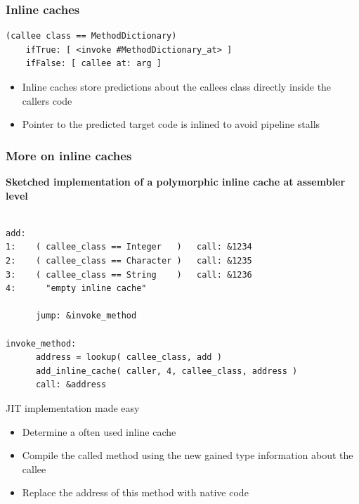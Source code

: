 \documentclass{beamer}
\begin{document}
\begin{frame}[fragile]
    \frametitle{Inline caches}

    \begin{lstlisting}
(callee class == MethodDictionary)
    ifTrue: [ <invoke #MethodDictionary_at> ]
    ifFalse: [ callee at: arg ]
    \end{lstlisting}

    \begin{itemize}
        \item Inline caches store predictions about the callees class directly inside the callers code
        \item Pointer to the predicted target code is inlined to avoid pipeline stalls
    \end{itemize}
\end{frame}

\lstset{language=C}

\begin{frame}[fragile]
    \frametitle{More on inline caches}

    {\bf Sketched implementation of a polymorphic inline cache at assembler level}

    \begin{lstlisting}

add:
1:    ( callee_class == Integer   )   call: &1234
2:    ( callee_class == Character )   call: &1235
3:    ( callee_class == String    )   call: &1236
4:      "empty inline cache"

      jump: &invoke_method

invoke_method:
      address = lookup( callee_class, add )
      add_inline_cache( caller, 4, callee_class, address )
      call: &address

    \end{lstlisting}

\end{frame}

\begin{frame}{JIT implementation made easy}
        \begin{itemize}
            \item Determine a often used inline cache
            \item Compile the called method using the new gained type information about the callee
            \item Replace the address of this method with native code
        \end{itemize}
\end{frame}
\end{document}

